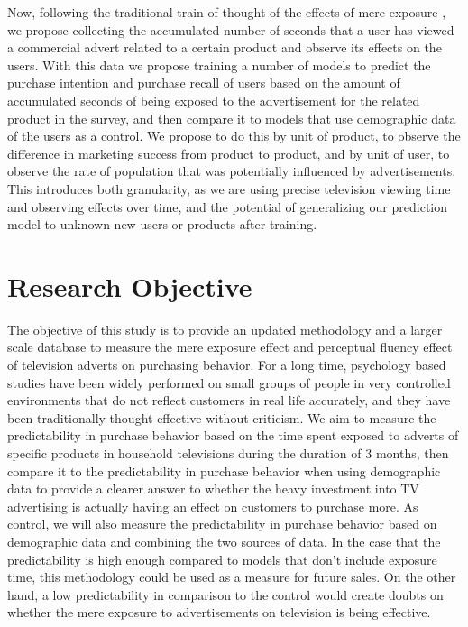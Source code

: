 \documentclass[review]{elsarticle}
\begin{document}
Now, following the traditional train of thought of the effects of mere exposure \cite{zajonc}, we propose collecting the accumulated number of seconds that a user has viewed a commercial advert related to a certain product and observe its effects on the users. With this data we propose training a number of models to predict the purchase intention and purchase recall of users based on the amount of accumulated seconds of being exposed to the advertisement for the related product in the survey, and then compare it to models that use demographic data of the users as a control. We propose to do this by unit of product, to observe the difference in marketing success from product to product, and by unit of user, to observe the rate of population that was potentially influenced by advertisements. This introduces both granularity, as we are using precise television viewing time and observing effects over time, and the potential of generalizing our prediction model to unknown new users or products after training.

\section{Research Objective}
\label{resobj}

The objective of this study is to provide an updated methodology and a larger scale database to measure the mere exposure effect and perceptual fluency effect of television adverts on purchasing behavior. For a long time, psychology based studies have been widely performed on small groups of people in very controlled environments that do not reflect customers in real life accurately, and they have been traditionally thought effective without criticism. We aim to measure the predictability in purchase behavior based on the time spent exposed to adverts of specific products in household televisions during the duration of 3 months, then compare it to the predictability in purchase behavior when using demographic data to provide a clearer answer to whether the heavy investment into TV advertising is actually having an effect on customers to purchase more. As control, we will also measure the predictability in purchase behavior based on demographic data and combining the two sources of data. In the case that the predictability is high enough compared to models that don't include exposure time, this methodology could be used as a measure for future sales. On the other hand, a low predictability in comparison to the control would create doubts on whether the mere exposure to advertisements on television is being effective.
\end{document}

